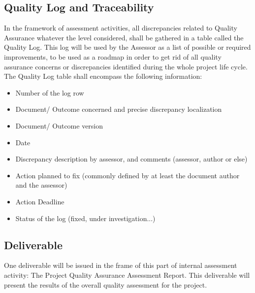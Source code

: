 \documentclass{template/openetcs_article}
\begin{document}
\subsection{Quality Log and Traceability}
In the framework of assessment activities, all discrepancies related to Quality Assurance whatever the level considered, shall be gathered in a table called the
Quality Log. This log will be used by the Assessor as a list of possible or required improvements, to be used as a roadmap in order to get rid of all quality
assurance concerns or discrepancies identified during the whole project life cycle.
The Quality Log table shall encompass the following information: 
\begin{itemize}
\item Number of the log row
\item Document/ Outcome concerned and precise discrepancy localization
\item Document/ Outcome version
\item Date
\item Discrepancy description by assessor, and comments (assessor, author or else)
\item Action planned to fix (commonly defined by at least the document author and the assessor)
\item Action Deadline
\item Status of the log (fixed, under investigation...)
\end{itemize}

\subsection{Deliverable}
One deliverable will be issued in the frame of this part of internal assessment activity: The Project Quality Assurance Assessment Report. This deliverable will present the results of the overall quality assessment for the project.
\end{document}
